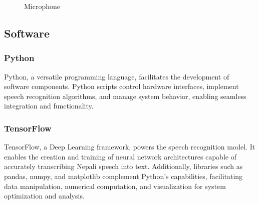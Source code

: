 \begin{figure}[H]
	\centering
	\caption{Microphone}
	\label{fig:MIC}
\end{figure}



\subsection{Software}
\subsubsection{Python}
Python, a versatile programming language, facilitates the development of software components. Python scripts control hardware interfaces, implement speech recognition algorithms, and manage system behavior, enabling seamless integration and functionality. 

\subsubsection{TensorFlow}
TensorFlow, a Deep Learning framework, powers the speech recognition model. It enables the creation and training of neural network architectures capable of accurately transcribing Nepali speech into text. Additionally, libraries such as pandas, numpy, and matplotlib complement Python's capabilities, facilitating data manipulation, numerical computation, and visualization 
for system optimization and analysis. 
